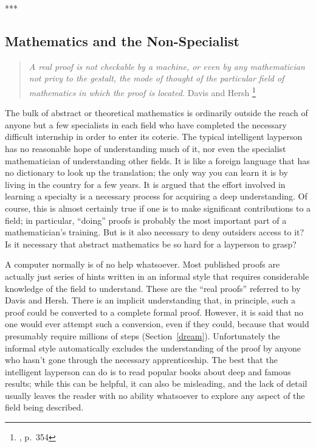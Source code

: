 \begin{center}
***
\end{center}

\subsection{Mathematics and the Non-Specialist}

\begin{quote}
  {\em A real proof is not checkable by a machine, or even by any mathematician
not privy to the gestalt, the mode of thought of the particular field of
mathematics in which the proof is located.}
  \flushright\sc  Davis and Hersh
  \footnote{\cite{Davis}, p.~354}\\
\end{quote}

The bulk of abstract or theoretical mathematics is ordinarily outside
the reach of anyone but a few specialists in each field who have completed
the necessary difficult internship in order to enter its coterie.  The
typical intelligent layperson has no reasonable hope of understanding much of
it, nor even the specialist mathematician of understanding other fields.  It
is like a foreign language that has no dictionary to look up the translation;
the only way you can learn it is by living in the country for a few years.  It
is argued that the effort involved in learning a specialty is a necessary
process for acquiring a deep understanding.  Of course, this is almost certainly
true if one is to make significant contributions to a field; in particular,
``doing'' proofs is probably the most important part of a mathematician's
training.  But is it also necessary to deny outsiders access to it?  Is it
necessary that abstract mathematics be so hard for a layperson to grasp?

A computer normally is of no help whatsoever.  Most published proofs are
actually just series of hints written in an informal style that requires
considerable knowledge of the field to understand.  These are the ``real
proofs'' referred to by Davis and Hersh.  There is an
implicit understanding that, in principle, such a proof could be converted to
a complete formal proof.  However, it is said that no one
would ever attempt such a conversion, even if they could, because that would
presumably require millions of steps (Section~\ref{dream}).  Unfortunately the
informal style automatically excludes the understanding of the proof
by anyone who hasn't gone through the necessary apprenticeship. The
best that the intelligent layperson can do is to read popular books about deep
and famous results; while this can be helpful, it can also be misleading, and
the lack of detail usually leaves the reader with no ability whatsoever to
explore any aspect of the field being described.

